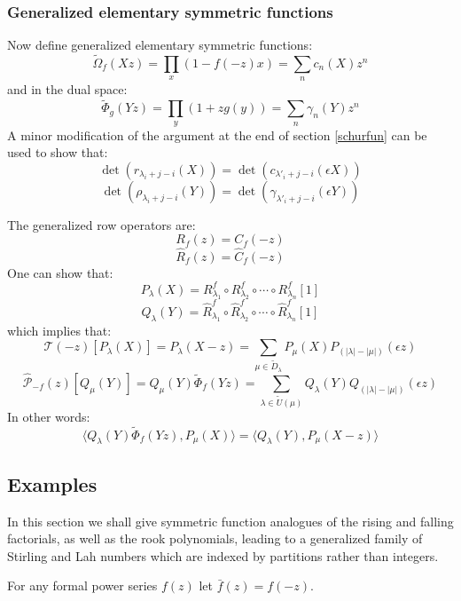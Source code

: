 \documentclass[12pt,dvips]{amsart}
\begin{document}
\subsubsection{Generalized elementary symmetric functions}
Now define generalized elementary symmetric functions:
$$ \tilde{\Omega}_{f}(Xz) = \prod_x (1 - f(-z)x) = \sum_n c_n(X) z^n $$
and in the dual space:
$$ \tilde{\Phi}_{g}(Yz) = \prod_y (1+zg(y)) = \sum_n \gamma_n(Y) z^n $$
A minor modification of the argument at the end of section \ref{schurfun} can be used to show that:
$$ \det(r_{\lambda_i + j - i}(X)) = \det(c_{\lambda'_i + j - i}(\epsilon X)) $$
$$ \det(\rho_{\lambda_i + j - i}(Y)) = \det(\gamma_{\lambda'_i + j - i}(\epsilon Y)) $$
\par\bigskip
The generalized row operators are: 
$${R}_f(z) = {C}_f(-z)$$ 
$$\hat{R}_f(z) = \hat{C}_f(-z)$$ 
One can show that:
$$ P_\lambda(X) = {R}^f_{\lambda_1} \circ {R}^f_{\lambda_2} \circ \cdots \circ {R}^f_{\lambda_n}[1] $$
$$ Q_\lambda(Y) = \hat{R}^f_{\lambda_1} \circ \hat{R}^f_{\lambda_2} \circ \cdots \circ \hat{R}^f_{\lambda_n}[1] $$
which implies that:
$$ \mathcal{T}(-z)[P_\lambda(X)] = P_\lambda(X - z) = \sum_{\mu \in \tilde{D}_{\lambda}} P_\mu(X) P_{(|\lambda| - |\mu|)}(\epsilon z) $$
$$ \hat{\mathcal{P}}_{-f}(z)[Q_\mu(Y)] = Q_\mu(Y) \tilde{\Phi}_f(Yz) = \sum_{\lambda \in \tilde{U}(\mu)} Q_\lambda(Y) Q_{(|\lambda| - |\mu|)}(\epsilon z) $$
In other words:
$$ \langle Q_\lambda(Y)\tilde{\Phi}_f(Yz) , P_\mu(X) \rangle = \langle Q_\lambda(Y), P_\mu(X-z) \rangle $$


\subsection{Examples}

In this section we shall give symmetric function analogues of the rising and falling factorials, as well as the rook polynomials, leading to a generalized family of Stirling and Lah numbers which are indexed by partitions rather than integers. 

\par\bigskip
For any formal power series $f(z)$ let $\bar{f}(z) = f(-z)$. 

\end{document}
